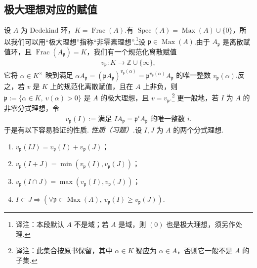 \subsection{极大理想对应的赋值}\label{sec:nt-3-3-3}
设 $A$ 为 Dedekind 环，$K=\operatorname{Frac}(A)$.有 $\operatorname{Spec}(A)=\operatorname{Max}(A)\cup\{0\}$，所以我们可以用``极大理想''指称``非零素理想''.\footnote{译注：本段默认 $A$ 不是域；若 $A$ 是域，则 $(0)$ 也是极大理想，须另作处理.}设 $\mathfrak p\in\operatorname{Max}(A)$.由于 $A_{\mathfrak p}$ 是离散赋值环，且 $\operatorname{Frac}(A_{\mathfrak p})=K$，我们有一个规范化离散赋值
\begin{align*}
v_{\mathfrak p}\colon K\longrightarrow\mathbb Z\cup\{\infty\},
\end{align*}
它将 $\alpha\in K^\times$ 映到满足 $\alpha A_{\mathfrak p}=(\mathfrak pA_{\mathfrak p})^{v_{\mathfrak p}(\alpha)}=\mathfrak p^{v_{\mathfrak p}(\alpha)}A_{\mathfrak p}$ 的唯一整数 $v_{\mathfrak p}(\alpha)$.反之，若 $v$ 是 $K$ 上的规范化离散赋值，且在 $A$ 上非负，则 $\mathfrak p:=\{\alpha\in K,\ v(\alpha)>0\}$ 是 $A$ 的极大理想，且 $v=v_{\mathfrak p}$.\footnote{译注：此集合按原书保留，其中 $\alpha\in K$ 疑应为 $\alpha\in A$，否则它一般不是 $A$ 的子集.}
更一般地，若 $I$ 为 $A$ 的非零分式理想，令
\begin{align*}
v_{\mathfrak p}(I):=\text{满足 }IA_{\mathfrak p}=\mathfrak p^iA_{\mathfrak p}\text{ 的唯一整数 }i.
\end{align*}
于是有以下容易验证的性质.
\emph{性质（习题）.}设 $I,J$ 为 $A$ 的两个分式理想.
\begin{enumerate}[label=\roman*)]
\item $v_{\mathfrak p}(IJ)=v_{\mathfrak p}(I)+v_{\mathfrak p}(J)$；
\item $v_{\mathfrak p}(I+J)=\min(v_{\mathfrak p}(I),v_{\mathfrak p}(J))$；
\item $v_{\mathfrak p}(I\cap J)=\max(v_{\mathfrak p}(I),v_{\mathfrak p}(J))$；
\item $I\subset J\Rightarrow(\forall\mathfrak p\in\operatorname{Max}(A),\ v_{\mathfrak p}(I)\ge v_{\mathfrak p}(J))$.
\end{enumerate}
